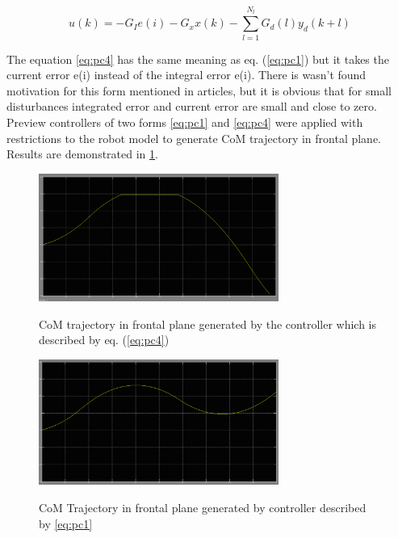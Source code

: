 \documentclass[12pt,a4paper]{report}
\begin{document}
			\begin{equation}\label{eq:pc4}
				u(k) = -G_I e(i) - G_xx(k) - \sum^{N_l}_{l=1}G_d(l)y_d(k+l)
			\end{equation}
			
			The equation \ref{eq:pc4} has the same meaning as eq. (\ref{eq:pc1}) but it takes the current error e(i) instead of the integral error e(i). There is wasn't found motivation for this form mentioned in articles, but it is obvious that for small disturbances integrated error and current error are small and close to zero. Preview controllers of two forms \ref{eq:pc1} and \ref{eq:pc4} were applied with restrictions to the robot model to generate CoM trajectory in frontal plane. Results are demonstrated in \cref{fig:22}.

		 	\begin{figure}[H]
		 		\vspace{-0.2cm}
		 		\centering
		 		{\includegraphics[width=0.7\textwidth]{22}}
		 		\caption{CoM trajectory in frontal plane generated by the controller which is described by eq. (\ref{eq:pc4})}
		 		\label{fig:22}
		 		\vspace{-0.1cm}
		 	\end{figure}
		 	\begin{figure}[H]
		 		\vspace{-0.2cm}
		 		\centering
		 		{\includegraphics[width=0.7\textwidth]{23}}
		 		\caption{CoM  Trajectory in frontal plane generated by controller described by \ref{eq:pc1}}
		 		\label{fig:23}
		 		\vspace{-0.1cm}
		 	\end{figure}
		 	
\end{document}
